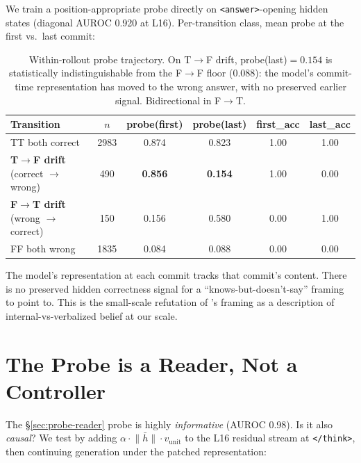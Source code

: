 \documentclass[11pt]{article}
\begin{document}
We train a position-appropriate probe directly on \texttt{<answer>}-opening hidden states (diagonal AUROC 0.920 at L16). Per-transition class, mean probe at the first vs.\ last commit:
\begin{table}[h]
\centering
\small
\begin{tabular}{lccccc}
\toprule
Transition & $n$ & probe(first) & probe(last) & first\_acc & last\_acc \\
\midrule
TT both correct & 2983 & 0.874 & 0.823 & 1.00 & 1.00 \\
\textbf{T$\to$F drift} (correct $\to$ wrong) & 490 & \textbf{0.856} & \textbf{0.154} & 1.00 & 0.00 \\
\textbf{F$\to$T drift} (wrong $\to$ correct) & 150 & 0.156 & 0.580 & 0.00 & 1.00 \\
FF both wrong & 1835 & 0.084 & 0.088 & 0.00 & 0.00 \\
\bottomrule
\end{tabular}
\caption{Within-rollout probe trajectory. On T$\to$F drift, probe(last)$=0.154$ is statistically indistinguishable from the F$\to$F floor (0.088): the model's commit-time representation has moved to the wrong answer, with no preserved earlier signal. Bidirectional in F$\to$T.}
\end{table}

The model's representation at each commit tracks that commit's content. There is no preserved hidden correctness signal for a ``knows-but-doesn't-say'' framing to point to. This is the small-scale refutation of \citet{yuan2024probing}'s framing as a description of internal-vs-verbalized belief at our scale.

\section{The Probe is a Reader, Not a Controller}\label{sec:reader-not-controller}

The §\ref{sec:probe-reader} probe is highly \emph{informative} (AUROC 0.98). Is it also \emph{causal}? We test by adding $\alpha \cdot \bar{\|h\|} \cdot v_{\text{unit}}$ to the L16 residual stream at \texttt{</think>}, then continuing generation under the patched representation:
\end{document}

